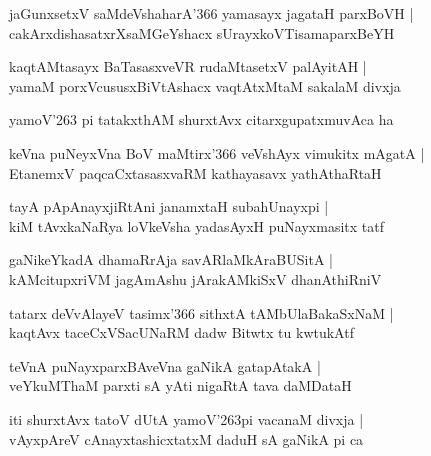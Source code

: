 \begin{shloka}
jaGunxsetxV saMdeVshaharA\char'366 yamasayx jagataH parxBoVH |\\
cakArxdishasatxrXsaMGeYshacx sUrayxkoVTisamaparxBeYH
\end{shloka}

\begin{shloka}
kaqtAMtasayx BaTasasxveVR rudaMtasetxV palAyitAH |\\
yamaM porxVcususxBiVtAshacx vaqtAtxMtaM sakalaM divxja
\end{shloka}

\begin{shloka}
yamoV\char'263 pi tatakxthAM shurxtAvx citarxgupatxmuvAca ha
\end{shloka}

\begin{shloka}
keVna puNeyxVna BoV maMtirx\char'366 veVshAyx vimukitx mAgatA |\\
EtanemxV paqcaCxtasasxvaRM kathayasavx yathAthaRtaH
\end{shloka}

\begin{shloka}
tayA pApAnayxjiRtAni janamxtaH subahUnayxpi |\\
kiM tAvxkaNaRya loVkeVsha yadasAyxH puNayxmasitx tatf
\end{shloka}

\begin{shloka}
gaNikeYkadA dhamaRrAja savARlaMkAraBUSitA |\\
kAMcitupxriVM jagAmAshu jArakAMkiSxV dhanAthiRniV
\end{shloka}

\begin{shloka}
tatarx deVvAlayeV tasimx\char'366 sithxtA tAMbUlaBakaSxNaM |\\
kaqtAvx taceCxVSacUNaRM dadw Bitwtx tu kwtukAtf
\end{shloka}

\begin{shloka}
teVnA puNayxparxBAveVna gaNikA gatapAtakA |\\
veYkuMThaM parxti sA yAti nigaRtA tava daMDataH
\end{shloka}

\begin{shloka}
iti shurxtAvx tatoV dUtA yamoV\char'263pi vacanaM divxja |\\
vAyxpAreV cAnayxtashicxtatxM daduH sA gaNikA pi ca
\end{shloka}

